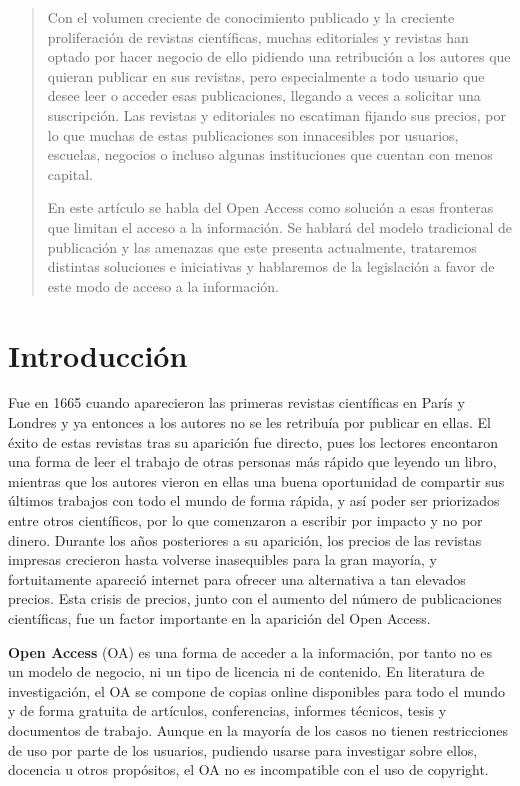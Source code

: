 \begin{abstract}
  Con el volumen creciente de conocimiento publicado y la creciente proliferación de revistas científicas, muchas editoriales y revistas han optado por hacer negocio de ello pidiendo una retribución a los autores que quieran publicar en sus revistas, pero especialmente a todo usuario que desee leer o acceder esas publicaciones, llegando a veces a solicitar una suscripción. Las revistas y editoriales no escatiman fijando sus precios, por lo que muchas de estas publicaciones son innacesibles por usuarios, escuelas, negocios o incluso algunas instituciones que cuentan con menos capital.     

  En este artículo se habla del Open Access como solución a esas fronteras que limitan el acceso a la información. Se hablará del modelo tradicional de publicación y las amenazas que este presenta actualmente, trataremos distintas soluciones e iniciativas y hablaremos de la legislación a favor de este modo de acceso a la información.
\end{abstract}


\section{Introducción}

Fue en 1665 cuando aparecieron las primeras revistas científicas en París y Londres y ya entonces a los autores no se les retribuía por publicar en ellas. El éxito de estas revistas tras su aparición fue directo, pues los lectores encontaron una forma de leer el trabajo de otras personas más rápido que leyendo un libro,  
mientras que los autores vieron en ellas una buena oportunidad de compartir sus últimos trabajos con todo el mundo de forma rápida, y así poder ser priorizados entre otros científicos, por lo que comenzaron a escribir por impacto y no por dinero. Durante los años posteriores a su aparición, los precios de las revistas impresas crecieron hasta volverse inasequibles para la gran mayoría, y fortuitamente apareció internet para ofrecer una alternativa a tan elevados precios. Esta crisis de precios, junto con el aumento del número de publicaciones científicas, fue un factor importante en la aparición del Open Access.

\textbf{Open Access} (OA) es una forma de acceder a la información, por tanto no es un modelo de negocio, ni un tipo de licencia ni de contenido. En literatura de investigación, el OA se compone de copias online disponibles para todo el mundo y de forma gratuita de artículos, conferencias, informes técnicos, tesis y documentos de trabajo. Aunque en la mayoría de los casos no tienen restricciones de uso por parte de los usuarios, pudiendo usarse para investigar sobre ellos, docencia u otros propósitos, el OA no es incompatible con el uso de copyright.

